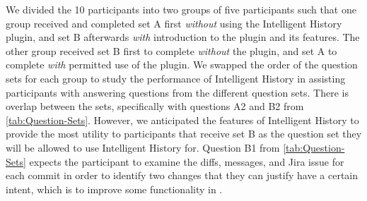 We divided the 10 participants into two groups of five participants such that one group received and completed set A first \emph{without} using the Intelligent History plugin, and set B afterwards \emph{with} introduction to the plugin and its features.
The other group received set B first to complete \emph{without} the plugin, and set A to complete \emph{with} permitted use of the plugin.
We swapped the order of the question sets for each group to study the performance of Intelligent History in assisting participants with answering questions from the different question sets.
There is overlap between the sets, specifically with questions A2 and B2 from \autoref{tab:Question-Sets}.
However, we anticipated the features of Intelligent History to provide the most utility to participants that receive set B as the question set they will be allowed to use Intelligent History for.
Question B1 from \autoref{tab:Question-Sets} expects the participant to examine the diffs, messages, and Jira issue for each commit in order to identify two changes that they can justify have a certain intent, which is to improve some functionality in . 

